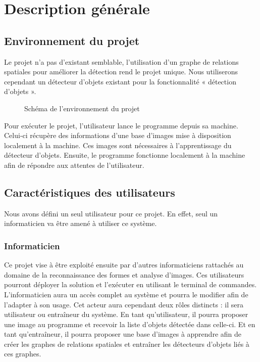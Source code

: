 \documentclass[debug,nodate,hideweeklyreports]{polytech/polytech}
\begin{document}
\chapter{Description générale}

\section{Environnement du projet}

Le projet n’a pas d’existant semblable, l’utilisation d’un graphe de relations spatiales pour améliorer la détection rend le projet unique. Nous utiliserons cependant un détecteur d’objets existant pour la fonctionnalité « détection d’objets ». 

\begin{figure}[H]
  \caption{Schéma de l'environnement du projet}
  \label{fig:envirproj}
\end{figure}

Pour exécuter le projet, l’utilisateur lance le programme depuis sa machine. Celui-ci récupère des informations d’une base d’images mise à disposition localement à la machine. Ces images sont nécessaires à l’apprentissage du détecteur d’objets. Ensuite, le programme fonctionne localement à la machine afin de répondre aux attentes de l’utilisateur. 

\section{Caractéristiques des utilisateurs}

Nous avons défini un seul utilisateur pour ce projet. En effet, seul un informaticien va être amené à utiliser ce système.

\subsection{Informaticien}

Ce projet vise à être exploité ensuite par d’autres informaticiens rattachés au domaine de la reconnaissance des formes et analyse d’images. Ces utilisateurs pourront déployer la solution et l’exécuter en utilisant le terminal de commandes.
L’informaticien aura un accès complet au système et pourra le modifier afin de l’adapter à son usage. 
Cet acteur aura cependant deux rôles distincts : il sera utilisateur ou entraîneur du système.
En tant qu’utilisateur, il pourra proposer une image au programme et recevoir la liste d’objets détectée dans celle-ci. Et en tant qu’entraîneur, il pourra proposer une base d’images à apprendre afin de créer les graphes de relations spatiales et entraîner les détecteurs d’objets liés à ces graphes.
\end{document}

